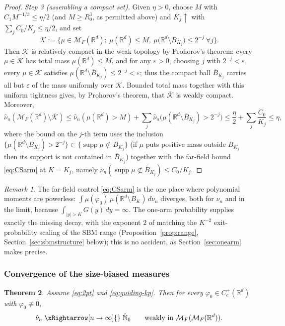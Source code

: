 \documentclass[11pt]{article}
\newtheorem{theorem}{Theorem}[section]
\theoremstyle{definition}
\theoremstyle{remark}
\newtheorem{remark}[theorem]{Remark}
\newcommand{\R}{\mathbb{R}}
\newcommand{\cM}{{\mathcal{M}_F(\R^d)}}          %
\newcommand{\cMM}{{\mathcal{M}_F(\mathcal{M}_F(\R^d))}}
\newcommand{\Cc}{C_c^+(\R^d)}
\newcommand{\supp}{\operatorname{supp}}
\newcommand{\eps}{\varepsilon}
\newcommand{\nuh}{\hat{\nu}}
\newcommand{\Nh}{\hat{\mathbb{N}}_0}
\numberwithin{equation}{section}
\theoremstyle{plain}
\theoremstyle{definition}
\theoremstyle{remark}
\theoremstyle{plain}
\begin{document}
\begin{proof}
\emph{Step 3 (assembling a compact set).} Given $\eta>0$, choose $M$ with $C_1M^{-1/3}\le\eta/2$ (and $M\ge R_0^3$, as
permitted above) and $K_j\uparrow$
with $\sum_jC_0/K_j\le\eta/2$, and set
\[
\mathcal K:=\bigl\{\mu\in\cM:\ \mu(\R^d)\le M,\
\mu\bigl(\R^d\setminus\overline B_{K_j}\bigr)\le 2^{-j}\ \forall j\bigr\}.
\]
Then $\mathcal K$ is relatively compact in the weak topology by Prohorov's
theorem: every $\mu\in\mathcal K$ has total mass $\mu(\R^d)\le M$, and for any
$\eps>0$, choosing $j$ with $2^{-j}<\eps$, every $\mu\in\mathcal K$ satisfies
$\mu(\R^d\setminus\overline B_{K_j})\le2^{-j}<\eps$; thus the compact ball $\overline B_{K_j}$
carries all but $\eps$ of the mass uniformly over $\mathcal K$. Bounded total
mass together with this uniform tightness gives, by Prohorov's theorem,
that $\overline{\mathcal K}$ is weakly compact. Moreover,
\[
\nuh_n(\cM\setminus\overline{\mathcal K})\le
\nuh_n(\mu(\R^d)>M)+\sum_j\nuh_n\bigl(\mu(\R^d\setminus\overline B_{K_j})>2^{-j}\bigr)
\le\frac{\eta}{2}+\sum_j\frac{C_0}{K_j}\le\eta,
\]
where the bound on the $j$-th term uses the inclusion
$\{\mu(\R^d\setminus\overline B_{K_j})>2^{-j}\}\subset\{\supp\mu\not\subset\overline B_{K_j}\}$
(if $\mu$ puts positive mass outside $\overline B_{K_j}$ then its support is not
contained in $\overline B_{K_j}$) together with the far-field bound \eqref{eq:CSarm} at
$K=K_j$, namely $\nuh_n(\supp\mu\not\subset\overline B_{K_j})\le C_0/K_j$.
\end{proof}

\begin{remark}
The far-field control \eqref{eq:CSarm} is the one place where polynomial
moments are powerless: $\int\mu(\varphi_0)\,\mu(\R^d\setminus B_K)\,d\nu_n$
diverges, both for $\nu_n$ and in the limit, because
$\int_{|y|>K}G(y)\,dy=\infty$. The one-arm probability supplies exactly the
missing decay, with the exponent $2$ of \cite{KN11} matching the
$K^{-2}$ exit-probability scaling of the SBM range
(Proposition~\ref{prop:range}, Section~\ref{sec:sbmstructure} below); this
is no accident, as Section~\ref{sec:onearm} makes precise.
\end{remark}

\subsubsection{Convergence of the size-biased measures}

\begin{theorem}\label{thm:biased}
 Assume \eqref{eq:2pt} and \eqref{eq:guiding-kp}. Then
for every $\varphi_0\in\Cc$ with $\varphi_0\not\equiv0$,
\[
\nuh_n\;\xRightarrow[n\to\infty]{}\;\Nh
\qquad\text{weakly in }\cMM .
\]
\end{theorem}
\end{document}
